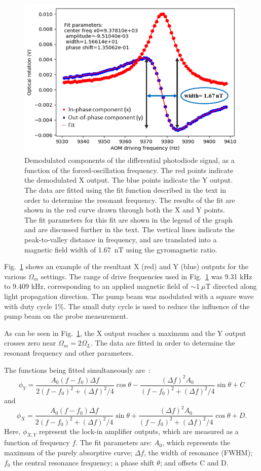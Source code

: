 \begin{figure}%
\centering\includegraphics[width=0.5\linewidth]{figures/FM_modulation}
\caption{Demodulated components of the differential photodiode signal,
  as a function of the forced-oscillation frequency.  The red points
  indicate the demodulated X output.  The blue points indicate the Y
  output.  The data are fitted using the fit function described in the
  text in order to determine the resonant frequency.  The results of
  the fit are shown in the red curve drawn through both the X and Y
  points.  The fit parameters for this fit are shown in the legend of
  the graph and are discussed further in the text.  The vertical lines
  indicate the peak-to-valley distance in frequency, and are
  translated into a magnetic field width of 1.67~nT using the
  gyromagnetic ratio.\label{fig:FMOR}}
\end{figure} 


Fig.~\ref{fig:FMOR} shows an example of the resultant X (red) and Y
(blue) outputs for the various $\Omega_m$ settings.  The range of
drive frequencies used in Fig.~\ref{fig:FMOR} was 9.31 kHz to 9.409
kHz, corresponding to an applied magnetic field of $\sim 1~\mu$T
directed along light propagation direction.  The pump beam was
modulated with a square wave with duty cycle 1\%.  The small duty
cycle is used to reduce the influence of the pump beam on the probe
measurement.

As can be seen in Fig.~\ref{fig:FMOR}, the X output reaches a maximum
and the Y output crosses zero near $\Omega_m=2\Omega_L$.  The data are
fitted in order to determine the resonant frequency and other
parameters.

The functions being fitted simultaneously are~\cite{mythesis}:
\begin{equation}
\phi_Y=\frac{A_0 (f-f_0 )\Delta f}{2(f-f_0 )^2+(\Delta f)^2/4}\cos\theta-\frac{(\Delta f)^2A_0}{(f-f_0 )^2+(\Delta f)^2/4}\sin\theta+C
\end{equation}
and
\begin{equation}
\phi_X=\frac{A_0 (f-f_0 )\Delta f}{2(f-f_0 )^2+(\Delta f)^2/4}\sin\theta+\frac{(\Delta f)^2A_0}{(f-f_0 )^2+(\Delta f)^2/4}\cos\theta+D.
\end{equation}
Here, $\phi_{X,Y}$ represent the lock-in amplifier outputs, which are
measured as a function of frequency $f$.  The fit parameters are:
$A_0$, which represents the maximum of the purely absorptive curve;
$\Delta f$, the width of resonance (FWHM); $f_0$ the central resonance
frequency; a phase shift $\theta$; and offsets C and D.

